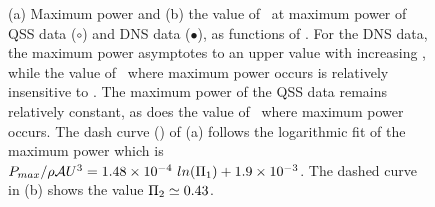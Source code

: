 \begin{figure}
    \caption{(a) Maximum power and (b) the value of \massdamp\ at
      maximum power of QSS data ($\circ$) and DNS data ($\bullet$), as
      functions of \massstiff.  For the DNS data, the maximum power
      asymptotes to an upper value with increasing \massstiff, while
      the value of \massdamp\ where maximum power occurs is relatively
      insensitive to \massstiff. The maximum power of the QSS data
      remains relatively constant, as does the value of \massdamp\
      where maximum power occurs. The dash curve (\protect\dashedrule)
      of (a) follows the logarithmic fit of the maximum power which is
      $P_{max}/\rho \mathcal{A}U^3 =1.48 \times 10^{-4} \
      ln(\Pi_1) + 1.9 \times 10^{-3} $. The dashed curve in (b)
      shows the value $\Pi_2\simeq 0.43$.}

    \label{fig:max_power}
\end{figure}


